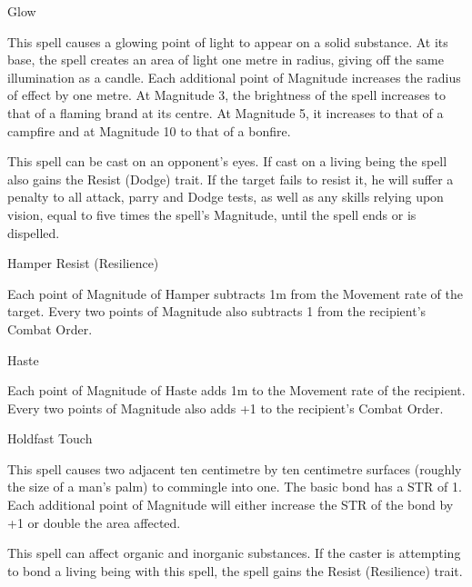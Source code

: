 \begin{rpg-spell}
{Glow}
{}

This spell causes a glowing point of light to appear on a solid substance. At its base, the spell creates an area of light one metre in radius, giving off the same illumination as a candle. Each additional point of Magnitude increases the radius of effect by one metre. At Magnitude 3, the brightness of the spell increases to that of a flaming brand at its centre. At Magnitude 5, it increases to that of a campfire and at Magnitude 10 to that of a bonfire. 

This spell can be cast on an opponent’s eyes. If cast on a living being the spell also gains the Resist (Dodge) trait. If the target fails to resist it, he will suffer a penalty to all attack, parry and Dodge tests, as well as any skills relying upon vision, equal to five times the spell’s Magnitude, until the spell ends or is dispelled. 
\end{rpg-spell}


\begin{rpg-spell}
{Hamper}
{Resist (Resilience)}

Each point of Magnitude of Hamper subtracts 1m from the Movement rate of the target. Every two points of Magnitude also subtracts 1 from the recipient’s Combat Order.
\end{rpg-spell}


\begin{rpg-spell}
{Haste}
{}

Each point of Magnitude of Haste adds 1m to the Movement rate of the recipient. Every two points of Magnitude also adds +1 to the recipient’s Combat Order.
\end{rpg-spell}


\begin{rpg-spell}
{Holdfast}
{Touch}

This spell causes two adjacent ten centimetre by ten centimetre surfaces (roughly the size of a man’s palm) to commingle into one. The basic bond has a STR of 1. Each additional point of Magnitude will either increase the STR of the bond by +1 or double the area affected. 

This spell can affect organic and inorganic substances. If the caster is attempting to bond a living being with this spell, the spell gains the Resist (Resilience) trait.
\end{rpg-spell}


